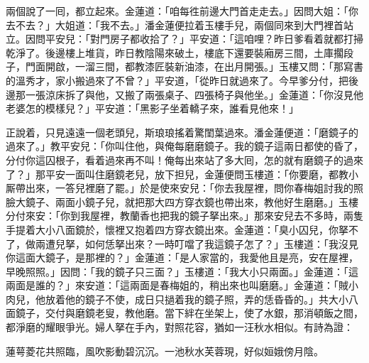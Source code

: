 兩個說了一囘，都立起來。金蓮道：「咱每徃前邊大門首走走去。」因問大姐：「你去不去？」大姐道：「我不去。」潘金蓮便拉着玉樓手兒，兩個同來到大門裡首站立。因問平安兒：「對門房子都收拾了？」平安道：「這咱哩？昨日爹看着就都打掃乾淨了。後邊樓上堆貨，昨日教陰陽來破土，樓底下還要裝廂房三間，土庫擱段子，門面開啟，一溜三間，都教漆匠裝新油漆，在出月開張。」玉樓又問：「那寫書的溫秀才，家小搬過來了不曾？」平安道，「從昨日就過來了。今早爹分付，把後邊那一張涼床拆了與他，又搬了兩張桌子、四張椅子與他坐。」金蓮道：「你沒見他老婆怎的模樣兒？」平安道：「黑影子坐着轎子來，誰看見他來！」

正說着，只見遠遠一個老頭兒，斯琅琅搖着驚閨葉過來。潘金蓮便道：「磨鏡子的過來了。」教平安兒：「你叫住他，與俺每磨磨鏡子。我的鏡子這兩日都使的昏了，分付你這囚根子，看着過來再不叫！俺每出來站了多大囘，怎的就有磨鏡子的過來了？」那平安一面叫住磨鏡老兒，放下担兒，金蓮便問玉樓道：「你要磨，都教小厮帶出來，一答兒裡磨了罷。」於是使來安兒：「你去我屋裡，問你春梅姐討我的照臉大鏡子、兩面小鏡子兒，就把那大四方穿衣鏡也帶出來，教他好生磨磨。」玉樓分付來安：「你到我屋裡，教蘭香也把我的鏡子拏出來。」那來安兒去不多時，兩隻手提着大小八面鏡於，懷裡又抱着四方穿衣鏡出來。金蓮道：「臭小囚兒，你拏不了，做兩遭兒拏，如何恁拏出來？一時叮噹了我這鏡子怎了？」玉樓道：「我沒見你這面大鏡子，是那裡的？」金蓮道：「是人家當的，我愛他且是亮，安在屋裡，早晚照照。」因問：「我的鏡子只三面？」玉樓道：「我大小只兩面。」金蓮道：「這兩面是誰的？」來安道：「這兩面是春梅姐的，稍出來也叫磨磨。」金蓮道：「賊小肉兒，他放着他的鏡子不使，成日只撾着我的鏡子照，弄的恁昏昏的。」共大小八面鏡子，交付與磨鏡老叟，教他磨。當下絆在坐架上，使了水銀，那消頓飯之間，都淨磨的耀眼爭光。婦人拏在手內，對照花容，猶如一汪秋水相似。有詩為證：

蓮萼菱花共照臨，風吹影動碧沉沉。一池秋水芙蓉現，好似姮娥傍月陰。

